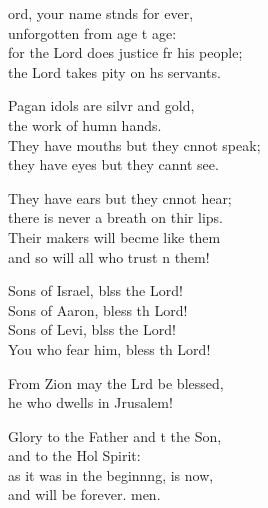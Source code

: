 \settowidth{\versewidth}{for the Lord does justice for his people; *}
\begin{psalmverse}%
  \begin{patverse}
ord, your name stnds for ever,\Med\\
unforgotten from age t age:\\
for the Lord does justice fr his people;\Med\\
the Lord takes pity on h\pointup{\i}s servants.

Pagan idols are silvr and gold,\Med\\
the work of humn hands.\\
They have mouths but they cnnot speak;\Med\\
they have eyes but they cannt see.

They have ears but they cnnot hear;\Med\\
there is never a breath on thir lips.\\
Their makers will becme like them\Med\\
and so will all who trust \pointup{\i}n them!

Sons of Israel, blss the Lord!\Med\\
Sons of Aaron, bless th Lord!\\
Sons of Levi, blss the Lord!\Med\\
You who fear him, bless th Lord!

From Zion may the Lrd be blessed,\Med\\
he who dwells in Jrusalem!

Glory to the Father and t the Son,\Med\\
and to the Hol Spirit:\\
as it was in the beginn\pointup{\i}ng, is now,\Med\\
and will be forever. men.
  \end{patverse}
\end{psalmverse}

